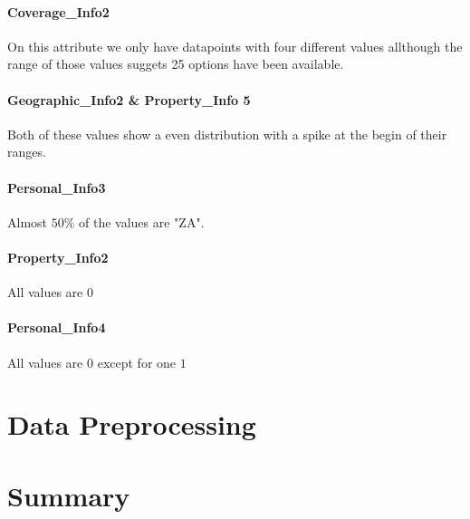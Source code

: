 \paragraph{Coverage\_Info2} On this attribute we only have datapoints with four different values allthough the range of those values suggets 25 options have been available.

\paragraph{Geographic\_Info2 \& Property\_Info 5} Both of these values show a  even distribution with a spike at the begin of their ranges.

\paragraph{Personal\_Info3} Almost $50 \text{\%}$ of the values are "ZA".
\paragraph{Property\_Info2} All values are $0$
\paragraph{Personal\_Info4} All values are $0$ except for one $1$

\section{Data Preprocessing}

\section{Summary}




